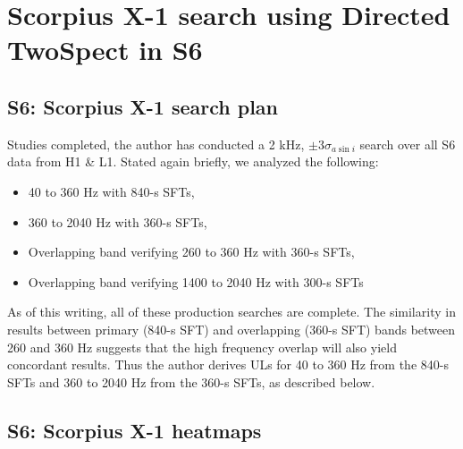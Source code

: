         \section{Scorpius X-1 search using Directed TwoSpect in S6}
        \label{directed_results}
 




\subsection{S6: Scorpius X-1 search plan}

Studies completed, the author has conducted a 2 kHz, $\pm 3 \sigma_{a \sin i}$ search over all S6 data from H1 \& L1.
Stated again briefly, we analyzed the following:
\begin{itemize}
\item 40 to 360 Hz with 840-s SFTs,
\item 360 to 2040 Hz with 360-s SFTs,
\item Overlapping band verifying 260 to 360 Hz with 360-s SFTs,
\item Overlapping band verifying 1400 to 2040 Hz with 300-s SFTs
\end{itemize}
As of this writing, all of these production searches are complete.
The similarity in results between primary (840-s SFT) and overlapping (360-s SFT) bands between 260 and 360 Hz suggests that the high frequency overlap will also yield concordant results.
Thus the author derives ULs for 40 to 360 Hz from the 840-s SFTs and 360 to 2040 Hz from the 360-s SFTs, as described below.

\subsection{S6: Scorpius X-1 heatmaps}

